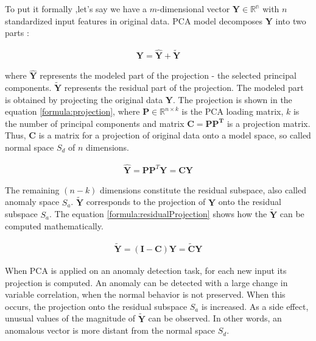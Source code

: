  To put it formally ,let's say we have a $m$-dimensional vector $\mathbf{Y} \in \mathbb{R^n}$ with $n$ standardized input features in original data. PCA model decomposes $\mathbf{Y}$ into two parts \cite{pca1997}: 
 
 \begin{gather}
     \mathbf{Y} = \mathbf{\hat{Y}} + \mathbf{\widetilde{Y}}
 \end{gather}
 
 where $\mathbf{\hat{Y}}$ represents the modeled part of the projection - the selected principal components. $\mathbf{\widetilde{Y}}$ represents the residual part of the projection. The modeled part is obtained by projecting the original data $\mathbf{{Y}}$. The projection is shown in the equation \ref{formula:projection}, where $\mathbf{P} \in \mathbb{R}^{n \times k}$ is the PCA loading matrix, $k$ is the number of principal components and matrix $\mathbf{C = \mathbf{PP}^T}$ is a projection matrix. Thus, $\mathbf{C}$ is a matrix for a projection of original data onto a model space, so called normal space $S_d$ of $n$ dimensions.

\begin{gather}
     \mathbf{\hat{Y}} = \mathbf{P}\mathbf{P}^T\mathbf{Y} = \mathbf{CY}
    \label{formula:projection}
\end{gather}

 The remaining $(n - k)$ dimensions constitute the residual subspace, also called anomaly space $S_a$. $\mathbf{\widetilde{Y}}$ corresponds to the projection of $\mathbf{Y}$ onto the residual subspace $S_a$. The equation \ref{formula:residualProjection} shows how the $\mathbf{\widetilde{Y}}$ can be computed mathematically.  
 
\begin{gather}
     \mathbf{\widetilde{Y}} = (\mathbf{I - C})\mathbf{Y} = \mathbf{\widetilde{C}Y}
    \label{formula:residualProjection}
\end{gather}
 
 When PCA is applied on an anomaly detection task, for each new input its projection is computed. An anomaly can be detected with a large change in variable correlation, when the normal behavior is not preserved. When this occurs, the projection onto the residual subspace $S_a$ is increased. As a side effect, unusual values of the magnitude of $\mathbf{\widetilde{Y}}$ can be observed. In other words, an anomalous vector is more distant from the normal space $S_d$.\\
 

